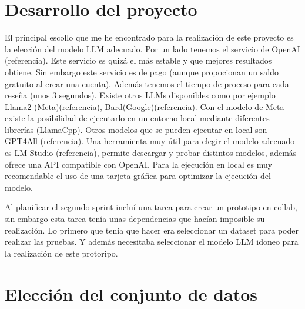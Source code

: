 \section{Desarrollo del proyecto}

El principal escollo que me he encontrado para la realización de este proyecto es la elección del modelo
LLM adecuado. Por un lado tenemos el servicio de OpenAI (referencia). Este servicio es quizá el más estable y que 
mejores resultados obtiene. Sin embargo este servicio es de pago (aunque propocionan un saldo gratuito al crear una cuenta).
Además tenemos el tiempo de proceso para cada reseña (unos 3 segundos).
Existe otros LLMs disponibles como por ejemplo Llama2 (Meta)(referencia), Bard(Google)(referencia).
Con el modelo de Meta existe la posibilidad de ejecutarlo en un entorno local mediante diferentes librerías (LlamaCpp).
Otros modelos que se pueden ejecutar en local son GPT4All (referencia).
Una herramienta muy útil para elegir el modelo adecuado es LM Studio (referencia), permite descargar y probar distintos modelos,
además ofrece una API compatible con OpenAI. 
Para la ejecución en local es muy recomendable el uso de una tarjeta gráfica para optimizar la ejecución del modelo.



Al planificar el segundo sprint incluí una tarea para crear un prototipo en collab, 
sin embargo esta tarea tenía unas dependencias que hacían imposible su realización.
Lo primero que tenía que hacer era seleccionar un dataset para poder realizar las pruebas.
Y además necesitaba seleccionar el modelo LLM idoneo para la realización de este protoripo.

\section{Elección del conjunto de datos}

